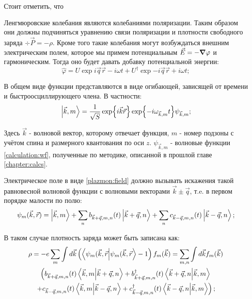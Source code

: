 \documentclass[../main.tex]{subfiles}
\begin{document}
    Стоит отметить, что 

    Ленгмюровские колебания являются колебаниями поляризации. Таким
    образом они должны подчиняться уравнению связи поляризации и 
    плотности свободного заряда $\div \vec P  = - \rho$. Кроме того 
    такие колебания могут возбуждаться внешним электрическим полем, 
    которое мы примем потенциальным $\vec E = - \grad \varphi$ и 
    гармоническим. Тогда оно будет давать добавку потенциальной энергии:
    \begin{equation}
        \label{plazmon:field}
        \hat \varphi  = U \exp{i\vec q \vec r - i \omega t}
            + U^{\dagger} \exp{-i\vec q\vec r + i \omega t};
    \end{equation}

    В общем виде функции представляются в виде огибающей, зависящей 
    от времени и быстроосциллирующего члена. В частности:
    \begin{equation}
        \label{plasmons:wf0}
        \ket{\vec k, m} = \frac{1}{\sqrt S} \exp{i\vec k \vec r}
            \exp{-i \omega_{\vec k, m} t} \psi_{\vec k, m};
    \end{equation}

    Здесь $\vec k$ - волновой вектор, которому отвечает функция, 
    $m$ - номер подзоны с учётом спина и размерного квантования 
    по оси $z$. $\psi_{\vec k, m}$ - волновые функции
    \ref{calculation:wf}, полученные по методике, 
    описанной в прошлой главе \ref{chapter:calcs}. 

    Электрическое поле в виде \ref{plazmon:field} должно вызывать 
    искажения 
    такой равновесной волновой функции с волновыми векторами
    $\vec k \pm \vec q$, т.e. в первом порядке малости по полю:
    \begin{equation}
        \label{plasmons:wf1}
        \psi_m (\vec k, \vec r) = \ket{\vec k, m} + \sum_n b_{\vec k 
            + \vec q, m, n} (t) \ket{\vec k + \vec q, n} + \sum_n 
            c_{\vec k - \vec q, m, n} (t) \ket{\vec k - \vec q, n};
    \end{equation}

    В таком случае плотность заряда может быть записана как:
    \begin{multline}
        \label{charge_density}
        \rho = -e \sum_{m} \int d\vec k  \left(
            \bra{\psi_m (\vec k, \vec r}\ket{\psi_m (\vec k, 
            \vec r} - 1\right) f_m(\vec k) =
            \sum_{m, n} \int d \vec k f_m (\vec k) \\
            \left( b_{\vec k + \vec q, m, n} (t)
            \bra{\vec k, m} \ket{\vec k 
            + \vec q, n} + b^\dagger_{\vec k + \vec q, m, n} (t) 
            \bra{\vec k + \vec q, n} \ket{\vec k, m}\right.\\ 
            \left. + c_{\vec k - \vec q, m, n} (t) \bra{\vec k, m} 
            \ket{\vec k  - \vec q, n} + c^\dagger_{\vec k - \vec q, m, n} 
            (t) \bra{\vec k - \vec q, n} \ket{\vec k, m} \right);
    \end{multline}
    
\end{document}
